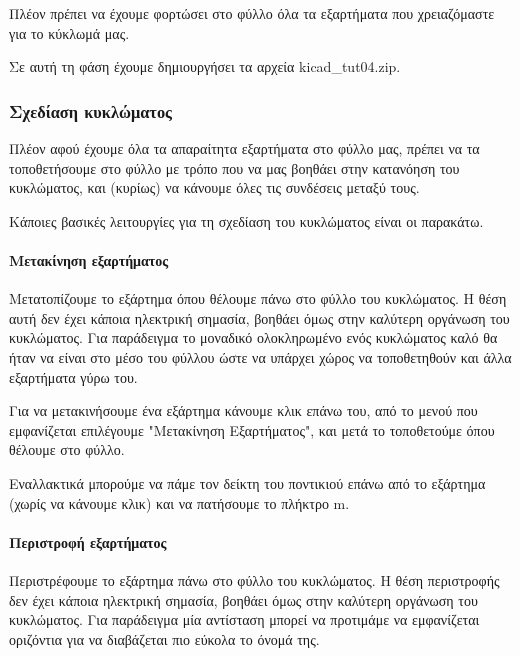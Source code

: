 \documentclass[a4paper]{article}
\begin{document}
Πλέον πρέπει να έχουμε φορτώσει στο φύλλο όλα τα εξαρτήματα που χρειαζόμαστε για το κύκλωμά μας.

\begin{figure}
  \begin{center}
    \label{fig:kicad-main}
  \end{center}
\end{figure}

Σε αυτή τη φάση έχουμε δημιουργήσει τα αρχεία kicad\_tut04.zip.

\subsubsection{Σχεδίαση κυκλώματος}

Πλέον αφού έχουμε όλα τα απαραίτητα εξαρτήματα στο φύλλο μας, πρέπει να τα τοποθετήσουμε στο φύλλο με τρόπο που να μας βοηθάει στην κατανόηση του κυκλώματος, και (κυρίως) να κάνουμε όλες τις συνδέσεις μεταξύ τους.

Κάποιες βασικές λειτουργίες για τη σχεδίαση του κυκλώματος είναι οι παρακάτω.

\paragraph{Μετακίνηση εξαρτήματος}
Μετατοπίζουμε το εξάρτημα όπου θέλουμε πάνω στο φύλλο του κυκλώματος. Η θέση αυτή δεν έχει κάποια ηλεκτρική σημασία, βοηθάει όμως στην καλύτερη οργάνωση του κυκλώματος. Για παράδειγμα το μοναδικό ολοκληρωμένο ενός κυκλώματος καλό θα ήταν να είναι στο μέσο του φύλλου ώστε να υπάρχει χώρος να τοποθετηθούν και άλλα εξαρτήματα γύρω του.

Για να μετακινήσουμε ένα εξάρτημα κάνουμε κλικ επάνω του, από το μενού που εμφανίζεται επιλέγουμε "Μετακίνηση Εξαρτήματος", και μετά το τοποθετούμε όπου θέλουμε στο φύλλο. 

Εναλλακτικά μπορούμε να πάμε τον δείκτη του ποντικιού επάνω από το εξάρτημα (χωρίς να κάνουμε κλικ) και να πατήσουμε το πλήκτρο m.

\paragraph{Περιστροφή εξαρτήματος}
Περιστρέφουμε το εξάρτημα πάνω στο φύλλο του κυκλώματος. Η θέση περιστροφής δεν έχει κάποια ηλεκτρική σημασία, βοηθάει όμως στην καλύτερη οργάνωση του κυκλώματος. Για παράδειγμα μία αντίσταση μπορεί να προτιμάμε να εμφανίζεται οριζόντια για να διαβάζεται πιο εύκολα το όνομά της.
\end{document}
